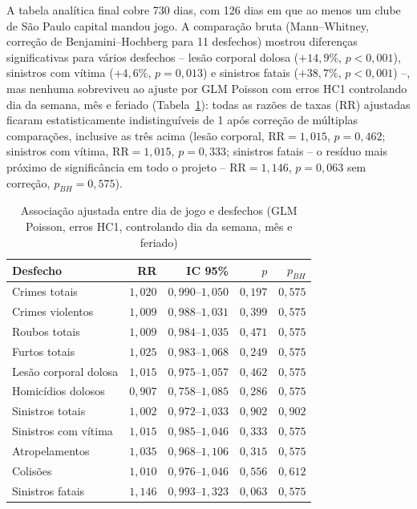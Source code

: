 \documentclass[12pt]{article}
\begin{document}
A tabela analítica final cobre 730 dias, com 126 dias em que ao menos um
clube de São Paulo capital mandou jogo. A comparação bruta (Mann--Whitney,
correção de Benjamini--Hochberg para 11 desfechos) mostrou diferenças
significativas para vários desfechos -- lesão corporal dolosa ($+14,9\%$,
$p<0,001$), sinistros com vítima ($+4,6\%$, $p=0,013$) e sinistros fatais
($+38,7\%$, $p<0,001$) --, mas nenhuma sobreviveu ao ajuste por GLM Poisson
com erros HC1 controlando dia da semana, mês e feriado
(Tabela~\ref{tab:glm}): todas as razões de taxas (RR) ajustadas ficaram
estatisticamente indistinguíveis de 1 após correção de múltiplas
comparações, inclusive as três acima (lesão corporal, $\text{RR}=1,015$,
$p=0,462$; sinistros com vítima, $\text{RR}=1,015$, $p=0,333$; sinistros
fatais -- o resíduo mais próximo de significância em todo o projeto --
$\text{RR}=1,146$, $p=0,063$ sem correção, $p_{BH}=0,575$).

\begin{table}[ht]
\centering
\caption{Associação ajustada entre dia de jogo e desfechos (GLM Poisson,
erros HC1, controlando dia da semana, mês e feriado)}
\label{tab:glm}
\small
\begin{tabular}{@{}lrrrr@{}}
\toprule
\textbf{Desfecho} & \textbf{RR} & \textbf{IC 95\%} & \textbf{$p$} & \textbf{$p_{BH}$} \\
\midrule
Crimes totais           & $1,020$ & $0,990$--$1,050$ & $0,197$ & $0,575$ \\
Crimes violentos        & $1,009$ & $0,988$--$1,031$ & $0,399$ & $0,575$ \\
Roubos totais           & $1,009$ & $0,984$--$1,035$ & $0,471$ & $0,575$ \\
Furtos totais           & $1,025$ & $0,983$--$1,068$ & $0,249$ & $0,575$ \\
Lesão corporal dolosa   & $1,015$ & $0,975$--$1,057$ & $0,462$ & $0,575$ \\
Homicídios dolosos      & $0,907$ & $0,758$--$1,085$ & $0,286$ & $0,575$ \\
Sinistros totais        & $1,002$ & $0,972$--$1,033$ & $0,902$ & $0,902$ \\
Sinistros com vítima    & $1,015$ & $0,985$--$1,046$ & $0,333$ & $0,575$ \\
Atropelamentos          & $1,035$ & $0,968$--$1,106$ & $0,315$ & $0,575$ \\
Colisões                & $1,010$ & $0,976$--$1,046$ & $0,556$ & $0,612$ \\
Sinistros fatais        & $1,146$ & $0,993$--$1,323$ & $0,063$ & $0,575$ \\
\bottomrule
\end{tabular}
\end{table}
\end{document}
